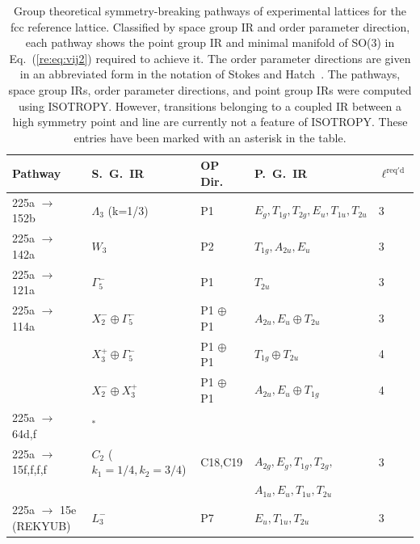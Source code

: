 \documentclass[preprint]{revtex4}
\begin{document}
\begin{table}[!ht]
\caption{Group theoretical symmetry-breaking pathways of experimental lattices
for the fcc reference lattice. Classified by space group IR and order
parameter direction, each pathway shows the point group IR and
minimal manifold of SO(3) in Eq.~(\ref{re:eq:vij2}) required to
achieve it.  The order parameter directions are given in an abbreviated form in the
notation of Stokes and
Hatch~\cite{Stokes02a}. The pathways, space
group IRs, order parameter directions, and point group IRs were computed using ISOTROPY.
However, transitions belonging to a coupled IR between a high symmetry point and line
are currently not a feature of ISOTROPY.  These entries have been marked with an asterisk in
the table.} \label{pathwaysFCC}\tiny
\begin{tabular}{lllll}\hline
Pathway & S.~G.~IR & OP Dir. & P.~G.~IR & $\ell^{\mathrm{req'd}}$  \\
\hline
225a $\rightarrow$ 152b & $\Lambda_3$ (k=1/3) &  P1 & $E_g,T_{1g},T_{2g},E_u,T_{1u},T_{2u}$ & 3 \\
225a $\rightarrow$ 142a & $W_3$ & P2 & $T_{1g},A_{2u},E_{u}$ & 3 \\

225a $\rightarrow$ 121a & $\Gamma_5^-$ & P1 & $T_{2u}$ & 3 \\

225a $\rightarrow$ 114a & $X_2^-\oplus \Gamma_5^-$ & P1 $\oplus$ P1 & $A_{2u},E_u \oplus
T_{2u}$ & 3 \\
& $X_3^+\oplus \Gamma_5^-$ &
P1 $\oplus$ P1 & $T_{1g} \oplus T_{2u}$ & 4 \\
& $X_2^- \oplus X_3^+$ & P1 $\oplus$ P1 & $A_{2u},E_{u} \oplus
T_{1g}$ & 4 \\

225a $\rightarrow$ 64d,f & $^*$\\

225a $\rightarrow$ 15f,f,f,f & $C_2$ ($k_1=1/4,k_2=3/4$) & C18,C19 & $A_{2g},E_g,T_{1g},T_{2g},$ & 3 \\
&  & & $A_{1u},E_u,T_{1u},T_{2u}$\\

225a $\rightarrow$ 15e (REKYUB) & $L_3^-$ & P7 &
$E_u,T_{1u},T_{2u}$ & 3 \\


\end{tabular}
\end{table}
\end{document}
